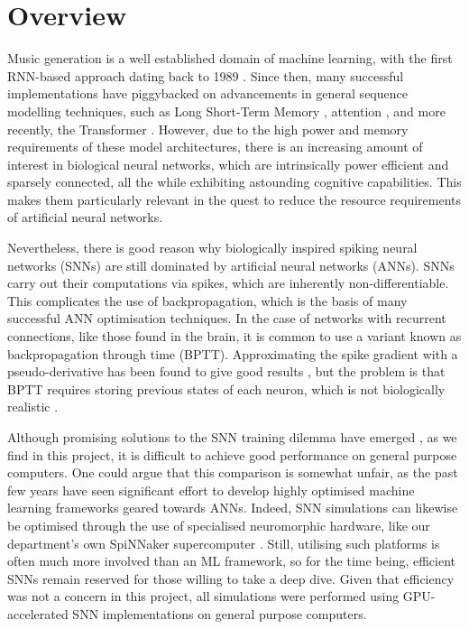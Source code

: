 \documentclass[../../report.tex]{subfiles}
\begin{document}
\section{Overview}

Music generation is a well established domain of machine learning, with the
first RNN-based approach dating back to 1989 \cite{Todd1989}. Since then, many
successful implementations have piggybacked on advancements in general sequence
modelling techniques, such as Long Short-Term Memory \cite{Eck2002}, attention
\cite{Waite2016}, and more recently, the Transformer \cite{Huang2018}. However,
due to the high power and memory requirements of these model architectures,
there is an increasing amount of interest in biological neural networks, which
are intrinsically power efficient and sparsely connected, all the while
exhibiting astounding cognitive capabilities. This makes them particularly
relevant in the quest to reduce the resource requirements of artificial neural
networks.

Nevertheless, there is good reason why biologically inspired spiking neural
networks (SNNs) are still dominated by artificial neural networks (ANNs). SNNs
carry out their computations via spikes, which are inherently
non-differentiable. This complicates the use of backpropagation, which is the
basis of many successful ANN optimisation techniques. In the case of networks
with recurrent connections, like those found in the brain, it is common to use a
variant known as backpropagation through time (BPTT). Approximating the spike
gradient with a pseudo-derivative has been found to give good results
\cite{Bellec2018LSNN}, but the problem is that BPTT requires storing previous
states of each neuron, which is not biologically realistic \cite{Lillicrap2019}.

Although promising solutions to the SNN training dilemma have emerged
\cite{Bellec2020}, as we find in this project, it is difficult to achieve good
performance on general purpose computers. One could argue that this comparison
is somewhat unfair, as the past few years have seen significant effort to
develop highly optimised machine learning frameworks geared towards ANNs.
Indeed, SNN simulations can likewise be optimised through the use of specialised
neuromorphic hardware, like our department's own SpiNNaker supercomputer
\cite{Furber2014}. Still, utilising such platforms is often much more involved
than an ML framework, so for the time being, efficient SNNs remain reserved for
those willing to take a deep dive. Given that efficiency was not a concern in
this project, all simulations were performed using GPU-accelerated SNN
implementations on general purpose computers.
\end{document}

